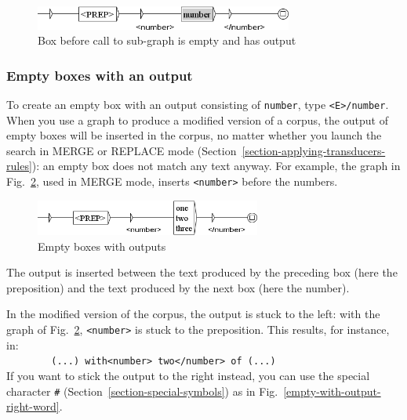\begin{figure}[!ht]
\begin{center}
\includegraphics[width=320px]{resources/img/output-and-call.png}
\caption{Box before call to sub-graph is empty and has output
\label{output-and-call}}
\end{center}
\end{figure}

\subsubsection{Empty boxes with an output}
To create an empty box with an output consisting of \verb+number+, type
\verb+<E>/number+. When you use a graph to produce a modified version of a
corpus, the output of empty boxes will be inserted in the corpus, no matter
whether you launch the search in MERGE or REPLACE mode
(Section~\ref{section-applying-transducers-rules}): an empty box does not match
any text anyway. For example, the graph in Fig.~\ref{empty-with-output}, used in
MERGE mode, inserts \verb$<number>$ before the numbers.

\begin{figure}[!ht]
\begin{center}
\includegraphics[width=280px]{resources/img/empty-with-output.png}
\caption{Empty boxes with outputs \label{empty-with-output}}
\end{center}
\end{figure}

\noindent The output is inserted between the text produced by the preceding box
(here the preposition) and the text produced by the next box (here the number).

\bigskip
\noindent In the modified version of the corpus, the output is stuck to the left:
with the graph of Fig.~\ref{empty-with-output},
\verb$<number>$ is stuck to the preposition. This results, for instance, in:\\

\verb$        (...) with<number> two</number> of (...)$\\

\noindent If you want to stick the output to the right instead,
you can use the special character \verb$#$ (Section~\ref{section-special-symbols})
as in Fig.~\ref{empty-with-output-right-word}.

